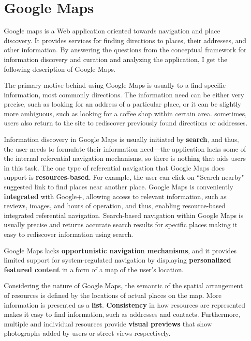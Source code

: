 {\section{Google Maps}
Google maps is a Web application oriented towards navigation and place discovery. It provides services for finding directions to places, their addresses, and other information. By answering the questions from the conceptual framework for information discovery and curation and analyzing the application, I get the following description of Google Maps.

The primary motive behind using Google Maps is usually to a find specific information, most commonly directions. The information need can be either very precise, such as looking for an address of a particular place, or it can be slightly more ambiguous, such as looking for a coffee shop within certain area. sometimes, users also return to the site to rediscover previously found directions or addresses.

Information discovery in Google Maps is usually initiated by \textbf{search}, and thus, the user needs to formulate their information need---the application lacks some of the internal referential navigation mechanisms, so there is nothing that aids users in this task. The one type of referential navigation that Google Maps does support is \textbf{resources-based}. For example, the user can click on ``Search nearby" suggested link to find places near another place. Google Maps is conveniently \textbf{integrated} with Google+, allowing access to relevant information, such as reviews, images, and hours of operation, and thus, enabling resource-based integrated referential navigation. Search-based navigation within Google Maps is usually precise and returns accurate search results for specific places making it easy to rediscover information using search. 

Google Maps lacks \textbf{opportunistic navigation mechanisms}, and it provides limited support for system-regulated navigation by displaying \textbf{personalized featured content} in a form of a map of the user's location.  

Considering the nature of Google Maps, the semantic of the spatial arrangement of resources is defined by the locations of actual places on the map. More information is presented as a \textbf{list}. \textbf{Consistency} in how resources are represented makes it easy to find information, such as addresses and contacts. Furthermore, multiple and individual resources provide \textbf{visual previews} that show photographs added by users or street views respectively.

}
